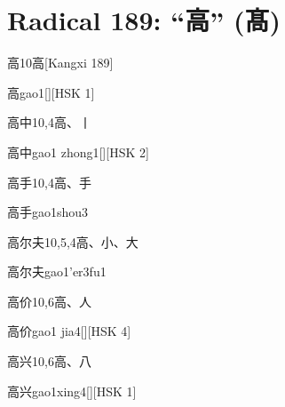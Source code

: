 
\section*{Radical 189: ``⾼'' (髙)}

\begin{entry}{高}{10}{⾼}[Kangxi 189]
  \begin{phonetics}{高}{gao1}[][HSK 1]
  \end{phonetics}
\end{entry}

\begin{entry}{高中}{10,4}{⾼、⼁}
  \begin{phonetics}{高中}{gao1 zhong1}[][HSK 2]
  \end{phonetics}
\end{entry}

\begin{entry}{高手}{10,4}{⾼、⼿}
  \begin{phonetics}{高手}{gao1shou3}
  \end{phonetics}
\end{entry}

\begin{entry}{高尔夫}{10,5,4}{⾼、⼩、⼤}
  \begin{phonetics}{高尔夫}{gao1'er3fu1}
  \end{phonetics}
\end{entry}

\begin{entry}{高价}{10,6}{⾼、⼈}
  \begin{phonetics}{高价}{gao1 jia4}[][HSK 4]
  \end{phonetics}
\end{entry}

\begin{entry}{高兴}{10,6}{⾼、⼋}
  \begin{phonetics}{高兴}{gao1xing4}[][HSK 1]
  \end{phonetics}
\end{entry}

